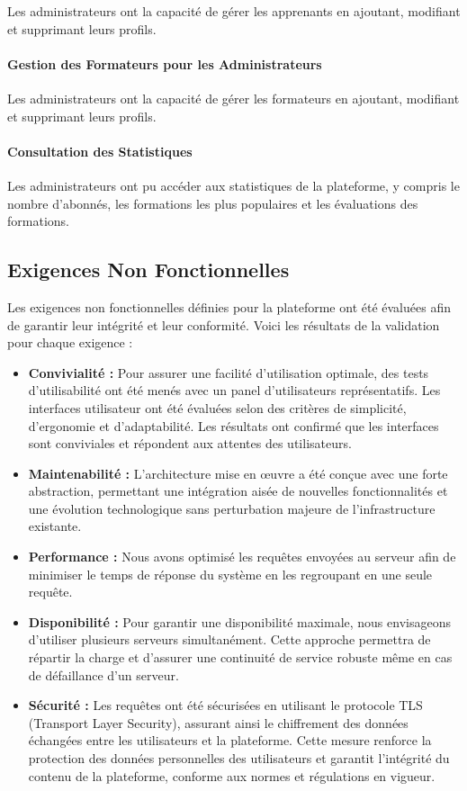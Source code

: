 Les administrateurs ont la capacité de gérer les apprenants en ajoutant, modifiant et supprimant leurs profils.

\paragraph{Gestion des Formateurs pour les Administrateurs}

Les administrateurs ont la capacité de gérer les formateurs en ajoutant, modifiant et supprimant leurs profils.

\paragraph{Consultation des Statistiques}

Les administrateurs ont pu accéder aux statistiques de la plateforme, y compris le nombre d'abonnés, les formations les plus populaires et les évaluations des formations.

\subsection{Exigences Non Fonctionnelles}

Les exigences non fonctionnelles définies pour la plateforme ont été évaluées afin de garantir leur intégrité et leur conformité. Voici les résultats de la validation pour chaque exigence :

\begin{itemize}
\item \textbf{Convivialité :} Pour assurer une facilité d'utilisation optimale, des tests d'utilisabilité ont été menés avec un panel d'utilisateurs représentatifs. Les interfaces utilisateur ont été évaluées selon des critères de simplicité, d'ergonomie et d'adaptabilité. Les résultats ont confirmé que les interfaces sont conviviales et répondent aux attentes des utilisateurs.
\item \textbf{Maintenabilité :} L'architecture mise en œuvre a été conçue avec une forte abstraction, permettant une intégration aisée de nouvelles fonctionnalités et une évolution technologique sans perturbation majeure de l'infrastructure existante.
\item \textbf{Performance :} Nous avons optimisé les requêtes envoyées au serveur afin de minimiser le temps de réponse du système en les regroupant en une seule requête.
\item \textbf{Disponibilité :} Pour garantir une disponibilité maximale, nous envisageons d'utiliser plusieurs serveurs simultanément. Cette approche permettra de répartir la charge et d'assurer une continuité de service robuste même en cas de défaillance d'un serveur.
\item \textbf{Sécurité :} Les requêtes ont été sécurisées en utilisant le protocole TLS (Transport Layer Security), assurant ainsi le chiffrement des données échangées entre les utilisateurs et la plateforme. Cette mesure renforce la protection des données personnelles des utilisateurs et garantit l'intégrité du contenu de la plateforme, conforme aux normes et régulations en vigueur.
\end{itemize}


